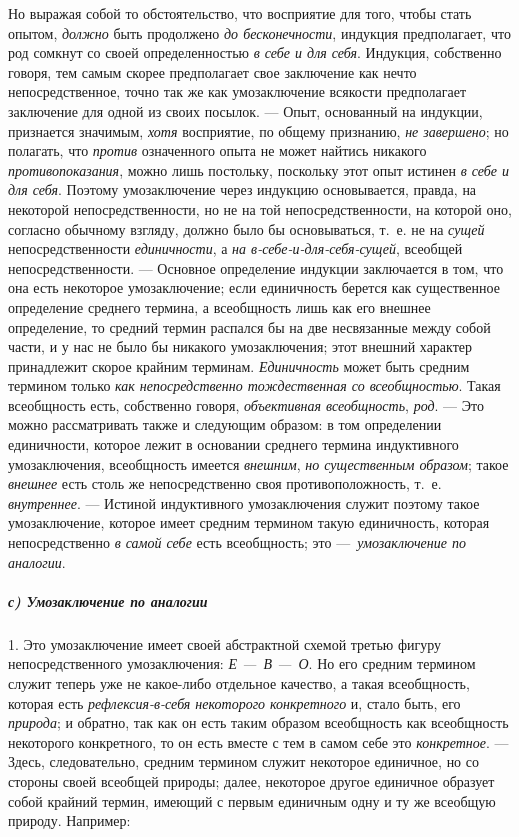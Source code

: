 \documentclass[twoside]{article}
\begin{document}
{{{{{Но выражая собой то обстоятельство, что восприятие для того,
чтобы стать опытом, {\em должно}
быть продолжено {\em до
бесконечности}, индукция предполагает, что род сомкнут со
своей определенностью {\em в себе и для
себя}. Индукция, собственно говоря, тем самым скорее
предполагает свое заключение как нечто непосредственное, точно так же как
умозаключение всякости предполагает заключение для одной из своих посылок.
— Опыт, основанный на индукции, признается значимым,
{\em хотя} восприятие, по
общему признанию, {\em не завершено};
но полагать, что
{\em против} означенного
опыта не может найтись никакого
{\em противопоказания},
можно лишь постольку, поскольку этот опыт истинен
{\em в себе и для себя}.
Поэтому умозаключение через индукцию основывается, правда, на
некоторой непосредственности, но не на той непосредственности, на которой
оно, согласно обычному взгляду, должно было бы основываться, т.~е. не на
{\em сущей}
непосредственности
{\em единичности}, а
{\em на в-себе-и-для-себя-сущей},
всеобщей непосредственности. — Основное
определение индукции заключается в том, что она есть некоторое
умозаключение; если единичность берется как существенное определение
среднего термина, а всеобщность лишь как его внешнее определение, то
средний термин распался бы на две несвязанные между собой части, и у нас не
было бы никакого умозаключения; этот внешний характер принадлежит скорое
крайним терминам. {\em Единичность}
может быть средним термином только
{\em как непосредственно тождественная
со всеобщностью}. Такая всеобщность есть, собственно говоря,
{\em объективная всеобщность},
{\em род}. — Это можно
рассматривать также и следующим образом: в том определении единичности,
которое лежит в основании среднего термина индуктивного умозаключения,
всеобщность имеется {\em внешним},
{\em но существенным образом};
такое {\em внешнее}
есть столь же непосредственно своя противоположность, т.~е.
{\em внутреннее}. —
Истиной индуктивного умозаключения служит поэтому
такое умозаключение, которое имеет средним термином такую
единичность, которая непосредственно
{\em в самой себе} есть
всеобщность; это —~{\em умозаключение по
аналогии}.

\subparagraph[с) Умозаключение по аналогии]{с) Умозаключение по аналогии}
1. Это умозаключение имеет своей абстрактной схемой третью
фигуру непосредственного умозаключения:
{\em Е —~В
—~О}. Но его средним термином служит теперь
уже не какое-либо отдельное качество, а такая всеобщность, которая есть
{\em рефлексия-в-себя некоторого
конкретного} и, стало быть, его
{\em природа}; и обратно,
так как он есть таким образом всеобщность как всеобщность некоторого
конкретного, то он есть вместе с тем в самом себе это
{\em конкретное}. —
Здесь, следовательно, средним термином служит некоторое
единичное, но со стороны своей всеобщей природы; далее, некоторое другое
единичное образует собой крайний термин, имеющий с первым единичным одну и
ту же всеобщую природу. Например:

}}}}}
\end{document}
